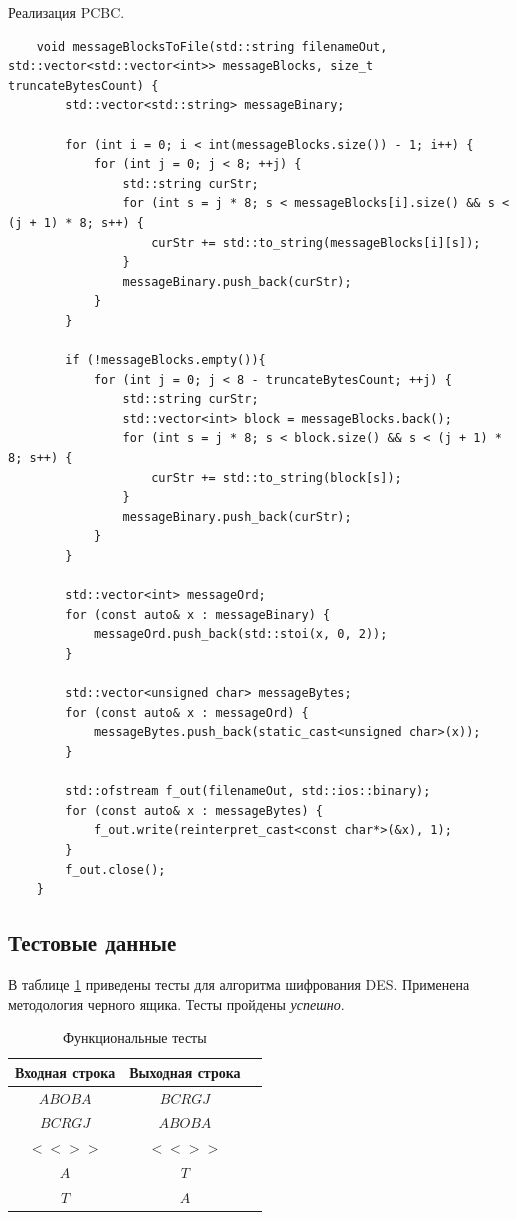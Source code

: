 Реализация PCBC.

\begin{lstlisting}
    void messageBlocksToFile(std::string filenameOut, std::vector<std::vector<int>> messageBlocks, size_t truncateBytesCount) {
        std::vector<std::string> messageBinary;
    
        for (int i = 0; i < int(messageBlocks.size()) - 1; i++) {
            for (int j = 0; j < 8; ++j) {
                std::string curStr;
                for (int s = j * 8; s < messageBlocks[i].size() && s < (j + 1) * 8; s++) {
                    curStr += std::to_string(messageBlocks[i][s]);
                }
                messageBinary.push_back(curStr);
            }
        }
    
        if (!messageBlocks.empty()){
            for (int j = 0; j < 8 - truncateBytesCount; ++j) {
                std::string curStr;
                std::vector<int> block = messageBlocks.back();
                for (int s = j * 8; s < block.size() && s < (j + 1) * 8; s++) {
                    curStr += std::to_string(block[s]);
                }
                messageBinary.push_back(curStr);
            }
        }
    
        std::vector<int> messageOrd;
        for (const auto& x : messageBinary) {
            messageOrd.push_back(std::stoi(x, 0, 2));
        }
    
        std::vector<unsigned char> messageBytes;
        for (const auto& x : messageOrd) {
            messageBytes.push_back(static_cast<unsigned char>(x));
        }
    
        std::ofstream f_out(filenameOut, std::ios::binary);
        for (const auto& x : messageBytes) {
            f_out.write(reinterpret_cast<const char*>(&x), 1);
        }
        f_out.close();
    }    
\end{lstlisting}


\subsection{Тестовые данные}

В таблице \ref{tbl:functional_test} приведены тесты для алгоритма шифрования DES. 
Применена методология черного ящика. Тесты пройдены \textit{успешно}.



\begin{table}[ht!]
	\begin{center}
		\captionsetup{justification=raggedright,singlelinecheck=off}
		\caption{\label{tbl:functional_test} Функциональные тесты}
		\begin{tabular}{|c|c|c|}
			\hline
			Входная строка & Выходная строка \\ 
			\hline
			$ABOBA$ & $BCRGJ$\\
			$BCRGJ$  & $ABOBA$\\
			$<<>>$  & $<<>>$ \\
            $A$ & $T$\\
			$T$  & $A$\\
			\hline
		\end{tabular}
	\end{center}
\end{table}

